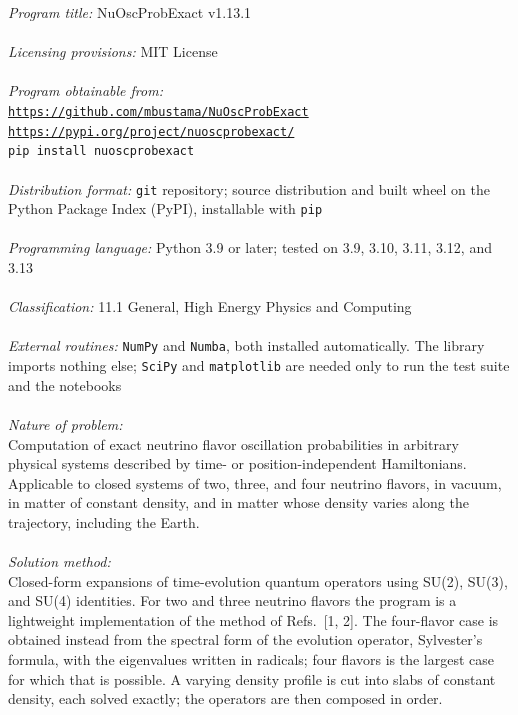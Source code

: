 \documentclass[final,5p,times,twocolumn,sort,compress]{elsarticle}
\begin{document}
\begin{small}
\noindent
{\em Program title:} NuOscProbExact v1.13.1    \\ \\
\smallskip
{\em Licensing provisions:} MIT License  \\ \\
\smallskip
{\em Program obtainable from:} \\
\href{https://github.com/mbustama/NuOscProbExact}{\tt https://github.com/mbustama/NuOscProbExact}  \\
\href{https://pypi.org/project/nuoscprobexact/}{\tt https://pypi.org/project/nuoscprobexact/} \\ 
{\tt pip install nuoscprobexact}  \\ \\
\smallskip
{\em Distribution format:} {\tt git} repository; source distribution and built wheel on the Python Package Index (PyPI), installable with {\tt pip} \\ \\
\smallskip
{\em Programming language:} Python 3.9 or later; tested on 3.9, 3.10, 3.11, 3.12, and 3.13   \\ \\
\smallskip
{\em Classification:} 11.1 General, High Energy Physics and Computing   \\ \\
\smallskip
{\em External routines:} {\tt NumPy} and {\tt Numba}, both installed automatically.  The library imports nothing else; {\tt SciPy} and {\tt matplotlib} are needed only to run the test suite and the notebooks   \\ \\
\smallskip
{\em Nature of problem:} \\
Computation of exact neutrino flavor oscillation probabilities in arbitrary physical systems described by time- or position-independent Hamiltonians.  Applicable to closed systems of two, three, and four neutrino flavors, in vacuum, in matter of constant density, and in matter whose density varies along the trajectory, including the Earth. \\ \\
\smallskip
{\em Solution method:}\\
Closed-form expansions of time-evolution quantum operators using SU(2), SU(3), and SU(4) identities.  For two and three neutrino flavors the program is a lightweight implementation of the method of Refs.\ [1, 2].  The four-flavor case is obtained instead from the spectral form of the evolution operator, Sylvester's formula, with the eigenvalues written in radicals; four flavors is the largest case for which that is possible.  A varying density profile is cut into slabs of constant density, each solved exactly; the operators are then composed in order. \\ \\

\end{small}
\end{document}
